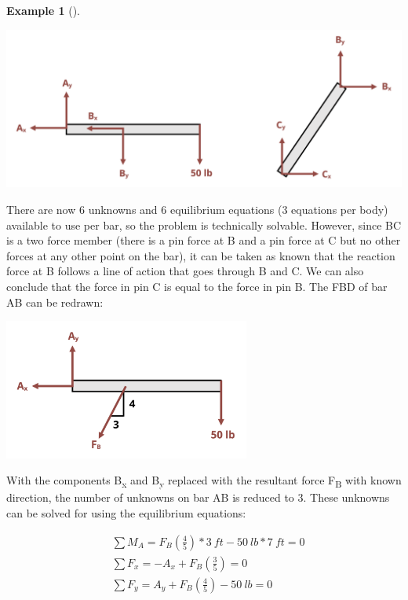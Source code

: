 \documentclass[
  letterpaper,
  DIV=11,
  numbers=noendperiod]{scrreprt}
\theoremstyle{definition}
\newtheorem{example}{Example}[chapter]
\theoremstyle{remark}
\begin{document}
\begin{tcolorbox}
\begin{example}[]
\begin{tcolorbox}
\begin{center}
\includegraphics[width=5.86458in,height=\textheight]{images/CH1 PNGs/example 1.3 part 2.png}
\end{center}

There are now 6 unknowns and 6 equilibrium equations (3 equations per
body) available to use per bar, so the problem is technically solvable.
However, since BC is a two force member (there is a pin force at B and a
pin force at C but no other forces at any other point on the bar), it
can be taken as known that the reaction force at B follows a line of
action that goes through B and C. We can also conclude that the force in
pin C is equal to the force in pin B. The FBD of bar AB can be redrawn:

\begin{center}
\includegraphics[width=3.1875in,height=\textheight]{images/CH1 PNGs/example 1.3 part 3.png}
\end{center}

With the components B\textsubscript{x} and B\textsubscript{y} replaced
with the resultant force F\textsubscript{B} with known direction, the
number of unknowns on bar AB is reduced to 3. These unknowns can be
solved for using the equilibrium equations:

\[
\begin{aligned}
& \sum M_A=F_B\left(\frac{4}{5}\right)*3{~ft}-50{~lb}*7{~ft}=0 \\
& \sum F_x=-A_x+F_B\left(\frac{3}{5}\right)=0 \\
& \sum F_y=A_y+F_B\left(\frac{4}{5}\right)-50{~lb}=0
\end{aligned}
\]


\end{tcolorbox}
\end{example}
\end{tcolorbox}
\end{document}
